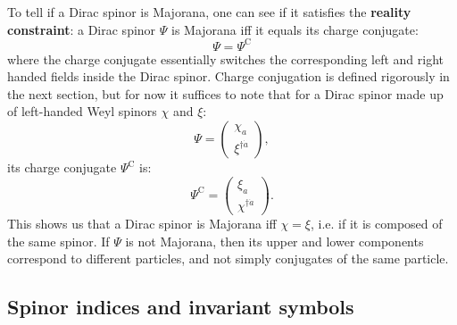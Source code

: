 \documentclass[11pt, oneside]{article}   	%
\theoremstyle{definition}
\begin{document}
To tell if a Dirac spinor is Majorana, one can see if it satisfies the \textbf{reality constraint}: a Dirac spinor $\Psi$ is Majorana iff it equals 
its charge conjugate:
\begin{equation}
	\Psi = \Psi^\mathrm{C}
\end{equation}
where the charge conjugate essentially switches the corresponding left and right handed fields inside the Dirac spinor. Charge conjugation is 
defined rigorously in the next section, but for now it suffices to note that for a Dirac spinor made up of left-handed Weyl spinors $\chi$ and 
$\xi$:
\begin{equation}
	\Psi = \begin{pmatrix} \chi_a \\ \xi^{\dagger \dot a}\end{pmatrix},
\end{equation}
its charge conjugate $\Psi^\mathrm{C}$ is:
\begin{equation}
	\Psi^\mathrm{C} = \begin{pmatrix} \xi_a \\ \chi^{\dagger\dot a}\end{pmatrix}.
\end{equation}
This shows us that a Dirac spinor is Majorana iff $\chi = \xi$, i.e. if it is composed of the same spinor. If $\Psi$ is not Majorana, then its 
upper and lower components correspond to different particles, and not simply conjugates of the same particle. 

\subsection{Spinor indices and invariant symbols}
\end{document}
